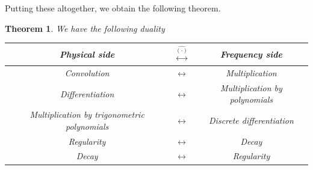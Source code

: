 \documentclass[8pt]{article}
\newtheorem{theorem}{Theorem} [section]
\begin{document}
Putting these altogether, we obtain the following theorem.
\begin{theorem}
  We have the following duality 
  \begin{center}
    \begingroup

\renewcommand{\arraystretch}{3} %
\begin{tabular}{ccc}
Physical side                               & $\stackrel{\widehat{(\cdot)}}{\longleftrightarrow}$ & Frequency side                \\ \hline
Convolution                                 & $\longleftrightarrow$ & Multiplication                \\
Differentiation                             & $\longleftrightarrow$ & Multiplication by polynomials \\
Multiplication by trigonometric polynomials & $\longleftrightarrow$ & Discrete differentiation      \\
Regularity                                  & $\longleftrightarrow$ & Decay                         \\
Decay                                       & $\longleftrightarrow$ & Regularity                   
\end{tabular}
  \end{center}
  \endgroup
\end{theorem}
\end{document}
